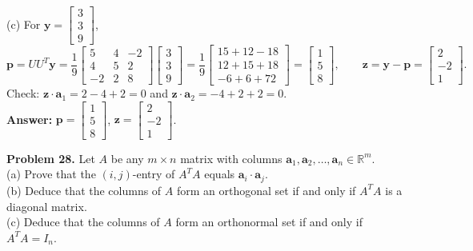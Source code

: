 \documentclass[11pt, letterpaper]{article}
\theoremstyle{definition}
\theoremstyle{remark}
\begin{document}
(c) For $\mathbf{y} = \begin{bmatrix} 3 \\ 3 \\ 9 \end{bmatrix}$,
\[
\mathbf{p} = U U^T \mathbf{y} = \frac{1}{9}\begin{bmatrix} 5 & 4 & -2 \\ 4 & 5 & 2 \\ -2 & 2 & 8 \end{bmatrix}\begin{bmatrix} 3 \\ 3 \\ 9 \end{bmatrix} = \frac{1}{9}\begin{bmatrix} 15 + 12 - 18 \\ 12 + 15 + 18 \\ -6 + 6 + 72 \end{bmatrix} = \begin{bmatrix} 1 \\ 5 \\ 8 \end{bmatrix}, \qquad
\mathbf{z} = \mathbf{y} - \mathbf{p} = \begin{bmatrix} 2 \\ -2 \\ 1 \end{bmatrix}.
\]
Check: $\mathbf{z} \cdot \mathbf{a}_1 = 2 - 4 + 2 = 0$ and $\mathbf{z} \cdot \mathbf{a}_2 = -4 + 2 + 2 = 0$. \\
\textbf{Answer:} $\mathbf{p} = \begin{bmatrix} 1 \\ 5 \\ 8 \end{bmatrix}$, $\mathbf{z} = \begin{bmatrix} 2 \\ -2 \\ 1 \end{bmatrix}$.

\textbf{Problem 28.} Let $A$ be any $m \times n$ matrix with columns $\mathbf{a}_1, \mathbf{a}_2, \dots, \mathbf{a}_n \in \mathbb{R}^m$. \\
(a) Prove that the $(i, j)$-entry of $A^T A$ equals $\mathbf{a}_i \cdot \mathbf{a}_j$. \\
(b) Deduce that the columns of $A$ form an orthogonal set if and only if $A^T A$ is a diagonal matrix. \\
(c) Deduce that the columns of $A$ form an orthonormal set if and only if $A^T A = I_n$.
\end{document}
